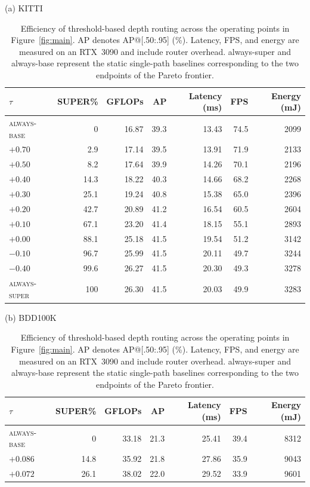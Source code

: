 \begin{table}[!t]
\caption{
    Efficiency of threshold-based depth routing across the operating points in Figure~\ref{fig:main}. 
    AP denotes AP@[.50:.95] (\%). 
    Latency, FPS, and energy are measured on an RTX~3090 and include router overhead. 
    always-super and always-base represent the static single-path baselines corresponding to the two endpoints of the Pareto frontier.
}
\label{tab:main}
\small
\setlength{\tabcolsep}{2.5pt}
\centering
\begin{minipage}[t]{0.49\textwidth}
\centering
{\small (a) KITTI}\\[2pt]
\footnotesize
\begin{tabular}{lrrrrrr}
\toprule
$\tau$ & SUPER\% & GFLOPs & AP & Latency (ms) & FPS & Energy (mJ)\\
\midrule
\textsc{always-base} & 0 & 16.87 & 39.3 & 13.43 & 74.5 & 2099\\
$+0.70$ & 2.9 & 17.14 & 39.5 & 13.91 & 71.9 & 2133\\
$+0.50$ & 8.2 & 17.64 & 39.9 & 14.26 & 70.1 & 2196\\
$+0.40$ & 14.3 & 18.22 & 40.3 & 14.66 & 68.2 & 2268\\
$+0.30$ & 25.1 & 19.24 & 40.8 & 15.38 & 65.0 & 2396\\
$+0.20$ & 42.7 & 20.89 & 41.2 & 16.54 & 60.5 & 2604\\
$+0.10$ & 67.1 & 23.20 & 41.4 & 18.15 & 55.1 & 2893\\
$+0.00$ & 88.1 & 25.18 & 41.5 & 19.54 & 51.2 & 3142\\
$-0.10$ & 96.7 & 25.99 & 41.5 & 20.11 & 49.7 & 3244\\
$-0.40$ & 99.6 & 26.27 & 41.5 & 20.30 & 49.3 & 3278\\
\textsc{always-super} & 100 & 26.30 & 41.5 & 20.03 & 49.9 & 3283\\
\bottomrule
\end{tabular}
\end{minipage}\hfill
\begin{minipage}[t]{0.49\textwidth}
\centering
{\small (b) BDD100K}\\[2pt]
\footnotesize
\begin{tabular}{lrrrrrr}
\toprule
$\tau$ & SUPER\% & GFLOPs & AP & Latency (ms) & FPS & Energy (mJ)\\
\midrule
\textsc{always-base} & 0 & 33.18 & 21.3 & 25.41 & 39.4 & 8312\\
$+0.086$ & 14.8 & 35.92 & 21.8 & 27.86 & 35.9 & 9043\\
$+0.072$ & 26.1 & 38.02 & 22.0 & 29.52 & 33.9 & 9601\\

\end{tabular}
\end{minipage}
\end{table}
